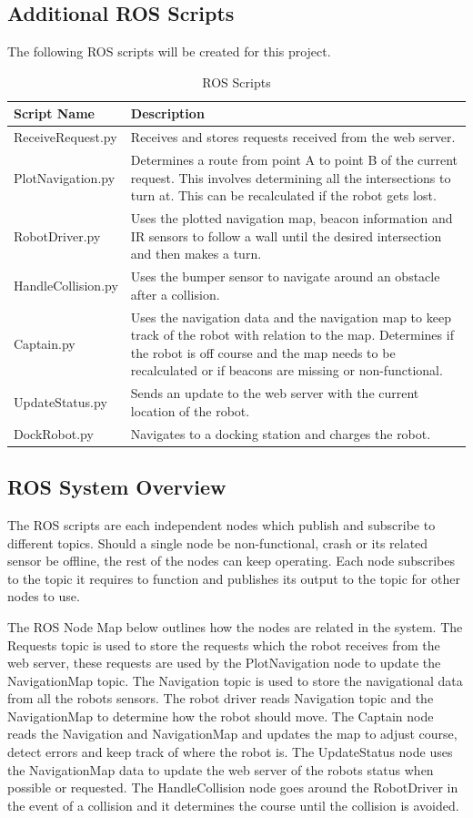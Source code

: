 \documentclass[12pt]{report}
\begin{document}
\subsection{Additional ROS Scripts}
The following ROS scripts will be created for this project.
\begin{table}[H]
\centering
\caption{ROS Scripts}
\centering
\begin{tabular} { | p{4cm} | p{8cm} | }
\hline
Script Name & Description \\
\hline
ReceiveRequest.py & Receives and stores requests received from the web server.\\
\hline
PlotNavigation.py & Determines a route from point A to point B of the current request. This involves determining all the intersections to turn at. This can be recalculated if the robot gets lost.\\
\hline
RobotDriver.py & Uses the plotted navigation map, beacon information and IR sensors to follow a wall until the desired intersection and then makes a turn. \\
\hline
HandleCollision.py & Uses the bumper sensor to navigate around an obstacle after a collision.\\
\hline
Captain.py & Uses the navigation data and the navigation map to keep track of the robot with relation to the map. Determines if the robot is off course and the map needs to be recalculated or if beacons are missing or non-functional. \\
\hline
UpdateStatus.py & Sends an update to the web server with the current location of the robot.\\
\hline
DockRobot.py & Navigates to a docking station and charges the robot.\\
\hline
\end{tabular}
\end{table}%

\subsection{ROS System Overview}
The ROS scripts are each independent nodes which publish and subscribe to different topics. Should a single node be non-functional, crash or its related sensor be offline, the rest of the nodes can keep operating. Each node subscribes to the topic it requires to function and publishes its output to the topic for other nodes to use.

The ROS Node Map below outlines how the nodes are related in the system. The Requests topic is used to store the requests which the robot receives from the web server, these requests are used by the PlotNavigation node to update the NavigationMap topic. The Navigation topic is used to store the navigational data from all the robots sensors. The robot driver reads Navigation topic and the NavigationMap to determine how the robot should move. The Captain node reads the Navigation and NavigationMap and updates the map to adjust course, detect errors and keep track of where the robot is. The UpdateStatus node uses the NavigationMap data to update the web server of the robots status when possible or requested. The HandleCollision node goes around the RobotDriver in the event of a collision and it determines the course until the collision is avoided.
\end{document}
